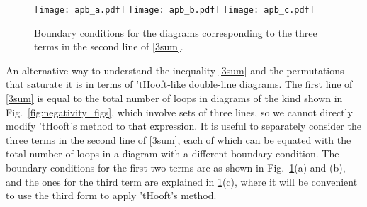 \documentclass[a4paper,11pt]{article}
\begin{document}
\begin{enumerate}
\begin{appendix}
\begin{figure}[]
\texttt{[image: apb\_a.pdf]} \texttt{[image: apb\_b.pdf]}
\texttt{[image: apb\_c.pdf]}
\caption{Boundary conditions for the diagrams corresponding to the three terms in the second line of \eqref{3sum}.}
\label{3fig}
\end{figure} 
An alternative way to understand the inequality \eqref{3sum} and the permutations that saturate it is in terms of 'tHooft-like double-line diagrams. The first line of \eqref{3sum} is equal to the total number of loops in diagrams of the kind shown in Fig.~\ref{fig:negativity_figs}, which involve sets of three lines, so we cannot directly modify 'tHooft's method to that expression. It is useful to separately consider the three terms in the second line of \eqref{3sum}, each of which can be equated with the total number of loops in a diagram with a different boundary condition. The boundary conditions for the first two terms are as shown in Fig.~\ref{3fig}(a) and (b), and the ones for the third term are explained in \ref{3fig}(c), where it will be convenient to use the third form to apply 'tHooft's method. 


\end{appendix}
\end{enumerate}
\end{document}
